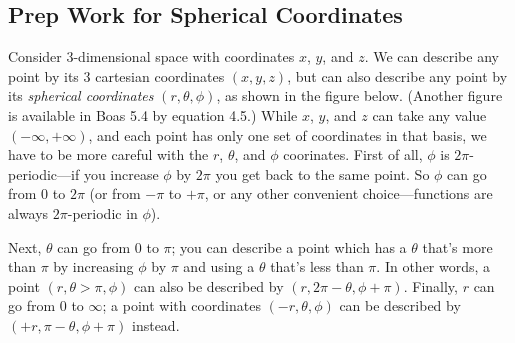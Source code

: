 \documentclass[answers]{exam}\newcommand{\repositoryInformationSetup}{     \usepackage[dvipsnames]{xcolor}     \usepackage[ angle=90, color=black, opacity=1, scale=2, ]{background}      \SetBgPosition{current page.west}      \SetBgVshift{-4.5mm}      \backgroundsetup{contents={{\color{green}\texttt{-{}-} differs from commit \texttt{aac605f} in 0 files}}} } \newcommand{\commit}{{{\color{green}aac605f}}}\usepackage{amsmath}
\providecommand{\id}{}
\renewcommand{\id}[1]{\ensuremath{\; \mathrm{d}#1}}
\newcommand{\ket}[1]{\ensuremath{\left|\;#1\;\right\rangle}}
\newcommand{\bracket}[2]{\ensuremath{\left\langle\;#1\;\middle|\;#2\;\right\rangle}}
\let\braket\bracket
\newcommand{\operator}[3]{\ensuremath{\left|\;#1\;\middle\rangle\; #2\; \middle\langle\;#3\;\right|}}
\begin{document}
\begin{questions}

	\clearpage
	\section*{Prep Work for Spherical Coordinates}
	\question Consider 3-dimensional space with coordinates $x$, $y$, and $z$.  We can describe any point by its 3 cartesian coordinates $(x, y, z)$, but can also describe any point by its \emph{spherical coordinates} $(r, \theta, \phi)$, as shown in the figure below.
	(Another figure is available in Boas 5.4 by equation 4.5.)
	While $x$, $y$, and $z$ can take any value $(-\infty,+\infty)$, and each point has only one set of coordinates in that basis, we have to be more careful with the $r$, $\theta$, and $\phi$ coorinates.  First of all, $\phi$ is $2\pi$-periodic---if you increase $\phi$ by $2\pi$ you get back to the same point.  So $\phi$ can go from 0 to $2\pi$ (or from $-\pi$ to $+\pi$, or any other convenient choice---functions are always $2\pi$-periodic in $\phi$).

	Next, $\theta$ can go from 0 to $\pi$; you can describe a point which has a $\theta$ that's more than $\pi$ by increasing $\phi$ by $\pi$ and using a $\theta$ that's less than $\pi$.  In other words, a point $(r, \theta > \pi, \phi)$ can also be described by $(r, 2\pi-\theta, \phi+\pi)$.
	Finally, $r$ can go from 0 to $\infty$; a point with coordinates $(-r,\theta,\phi)$ can be described by $(+r, \pi-\theta, \phi+\pi)$ instead.


\end{questions}
\end{document}
